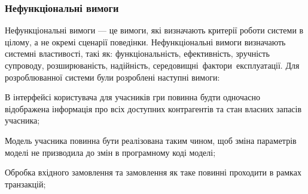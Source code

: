        \subsubsection{Нефункціональні вимоги}
Нефункціональні вимоги --- це вимоги, які визначають критерії роботи системи в цілому, а не окремі сценарії поведінки. Нефункціональні вимоги визначають системні властивості, такі як: функціональність, ефективність, зручність супроводу, розширюваність, надійність, середовищні фактори експлуатації. Для розроблюванної системи були розроблені наступні вимоги:
            \begin{longEnumerate}
\item В інтерфейсі користувача для учасників гри повинна будти одночасно відображена інформація про всіх доступних контрагентів та стан власних запасів учасника;
\item Модель учасника повинна бути реалізована таким чином, щоб зміна параметрів моделі не призводила до змін в програмному коді моделі; %
\item Обробка вхідного замовлення та замовлення як таке повинні проходити в рамках транзакцій;
            \end{longEnumerate}  
